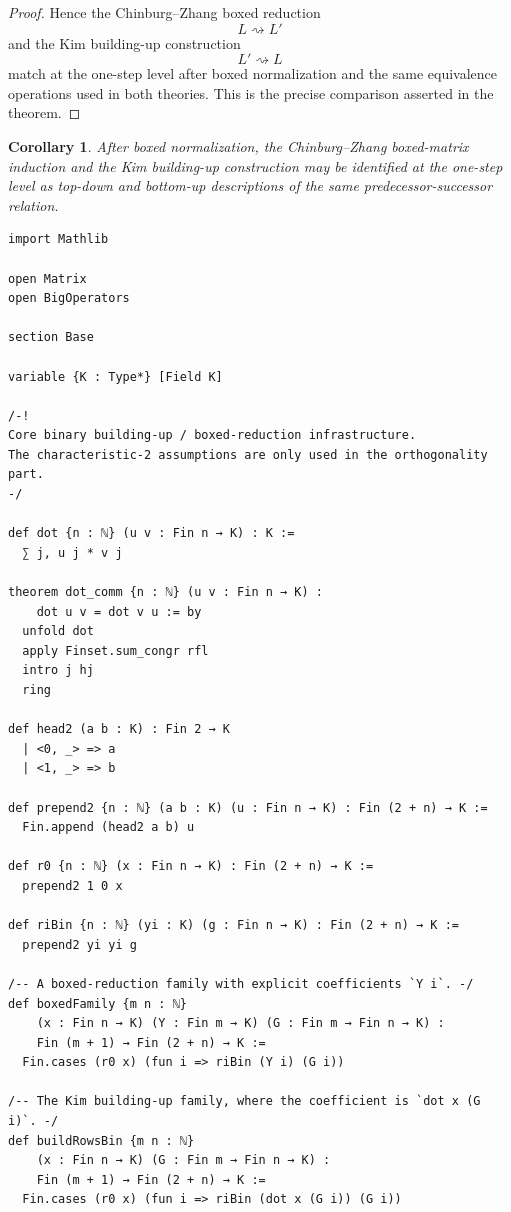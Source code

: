 \documentclass[12pt]{article}
\newtheorem{cor}[theorem]{Corollary}
\newenvironment{blueblock}{\begingroup\color{blue}}{\endgroup}
\begin{document}
\begin{blueblock}
\begin{proof}
Hence the Chinburg--Zhang boxed reduction
\[
L \rightsquigarrow L'
\]
and the Kim building-up construction
\[
L' \rightsquigarrow L
\]
match at the one-step level after boxed normalization and the same equivalence operations used in both theories. This is the precise comparison asserted in the theorem.
\end{proof}

\begin{cor}
After boxed normalization, the Chinburg--Zhang boxed-matrix induction and the Kim building-up construction may be identified at the one-step level as top-down and bottom-up descriptions of the same predecessor-successor relation.
\end{cor}
\end{blueblock}

\begin{lstlisting}[caption={Lean verification for Theorem~\ref{thm:CZ_Kim_Lagrangian}.}]
import Mathlib

open Matrix
open BigOperators

section Base

variable {K : Type*} [Field K]

/-!
Core binary building-up / boxed-reduction infrastructure.
The characteristic-2 assumptions are only used in the orthogonality part.
-/

def dot {n : ℕ} (u v : Fin n → K) : K :=
  ∑ j, u j * v j

theorem dot_comm {n : ℕ} (u v : Fin n → K) :
    dot u v = dot v u := by
  unfold dot
  apply Finset.sum_congr rfl
  intro j hj
  ring

def head2 (a b : K) : Fin 2 → K
  | <0, _> => a
  | <1, _> => b

def prepend2 {n : ℕ} (a b : K) (u : Fin n → K) : Fin (2 + n) → K :=
  Fin.append (head2 a b) u

def r0 {n : ℕ} (x : Fin n → K) : Fin (2 + n) → K :=
  prepend2 1 0 x

def riBin {n : ℕ} (yi : K) (g : Fin n → K) : Fin (2 + n) → K :=
  prepend2 yi yi g

/-- A boxed-reduction family with explicit coefficients `Y i`. -/
def boxedFamily {m n : ℕ}
    (x : Fin n → K) (Y : Fin m → K) (G : Fin m → Fin n → K) :
    Fin (m + 1) → Fin (2 + n) → K :=
  Fin.cases (r0 x) (fun i => riBin (Y i) (G i))

/-- The Kim building-up family, where the coefficient is `dot x (G i)`. -/
def buildRowsBin {m n : ℕ}
    (x : Fin n → K) (G : Fin m → Fin n → K) :
    Fin (m + 1) → Fin (2 + n) → K :=
  Fin.cases (r0 x) (fun i => riBin (dot x (G i)) (G i))


\end{lstlisting}
\end{document}
